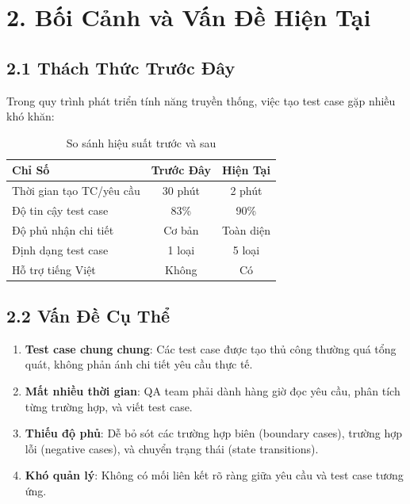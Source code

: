 \documentclass[14pt,a4paper]{article}
\begin{document}
\section{2. Bối Cảnh và Vấn Đề Hiện Tại}

\subsection{2.1 Thách Thức Trước Đây}
Trong quy trình phát triển tính năng truyền thống, việc tạo test case gặp nhiều khó khăn:

\begin{table}[h]
\centering
\begin{tabular}{|l|c|c|}
\hline
\textbf{Chỉ Số} & \textbf{Trước Đây} & \textbf{Hiện Tại} \\
\hline
Thời gian tạo TC/yêu cầu & 30 phút & 2 phút \\
\hline
Độ tin cậy test case & 83\% & 90\% \\
\hline
Độ phủ nhận chi tiết & Cơ bản & Toàn diện \\
\hline
Định dạng test case & 1 loại & 5 loại \\
\hline
Hỗ trợ tiếng Việt & Không & Có \\
\hline
\end{tabular}
\caption{So sánh hiệu suất trước và sau}
\end{table}

\subsection{2.2 Vấn Đề Cụ Thể}
\begin{enumerate}
    \item \textbf{Test case chung chung}: Các test case được tạo thủ công thường quá tổng quát, 
    không phản ánh chi tiết yêu cầu thực tế.
    
    \item \textbf{Mất nhiều thời gian}: QA team phải dành hàng giờ đọc yêu cầu, 
    phân tích từng trường hợp, và viết test case.
    
    \item \textbf{Thiếu độ phủ}: Dễ bỏ sót các trường hợp biên (boundary cases), 
    trường hợp lỗi (negative cases), và chuyển trạng thái (state transitions).
    
    \item \textbf{Khó quản lý}: Không có mối liên kết rõ ràng giữa yêu cầu 
    và test case tương ứng.
\end{enumerate}
\end{document}

